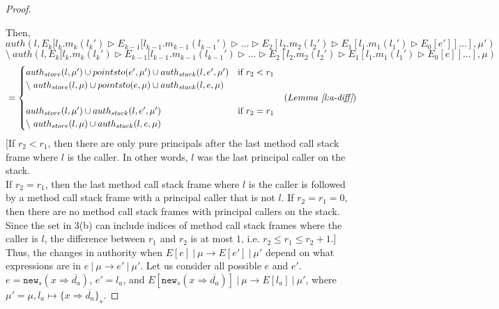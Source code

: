 \documentclass{llncs}
\newcommand{\keywadj}[1]{\mathtt{#1}}
\newcommand{\intuition}[1]{#1}
\begin{document}
\begin{proof}
\begin{enumerate}
\end{enumerate}
Then,
\noindent$auth(l, E_k[l_k.m_k(l_k') \rhd E_{k-1}[l_{k-1}.m_{k-1}(l_{k-1}') \rhd \dots \rhd E_2[l_2.m_2(l_2') \rhd E_1[l_1.m_1(l_1') \rhd E_0[e']] \dots ], \mu')$\\
$\setminus~auth(l, E_k[l_k.m_k(l_k') \rhd E_{k-1}[l_{k-1}.m_{k-1}(l_{k-1}') \rhd \dots \rhd E_2[l_2.m_2(l_2') \rhd E_1[l_1.m_1(l_1') \rhd E_0[e]] \dots ], \mu)$
\vspace{-7pt}
\begin{align*}
&=
\begin{cases}
    auth_{store}(l, \mu') \cup pointsto(e', \mu') \cup auth_{stack}(l, e', \mu') & \text{if } r_2 < r_1\\
    \setminus~auth_{store}(l, \mu) \cup pointsto(e, \mu) \cup auth_{stack}(l, e, \mu)\\\\
    auth_{store}(l, \mu') \cup auth_{stack}(l, e', \mu')& \text{if } r_2 = r_1\\
    \setminus~auth_{store}(l, \mu) \cup auth_{stack}(l, e, \mu)
\end{cases} & (Lemma~\textit{\ref{l:a-diff}})
\end{align*}
\intuition{[If $r_2 < r_1$, then there are only pure principals after the last method call stack frame where $l$ is the caller. In other words, $l$ was the last principal caller on the stack.\\
If $r_2 = r_1$, then the last method call stack frame where $l$ is the caller is followed by a method call stack frame with a principal caller that is not $l$. If $r_2 = r_1 = 0$, then there are no method call stack frames with principal callers on the stack.\\
Since the set in 3(b) can include indices of method call stack frames where the caller is $l$, the difference between $r_1$ and $r_2$ is at most $1$, i.e. $r_2 \le r_1 \le r_2 + 1$.]}\\
Thus, the changes in authority when $E[e]~|~\mu \longrightarrow E[e']~|~\mu'$ depend on what expressions are in $e~|~\mu \longrightarrow e'~|~\mu'$. Let us consider all possible $e$ and $e'$.\\


\noindent{}
\mbox{$e = \keywadj{new}_s(x \Rightarrow \overline{d_a})$}, \mbox{$e' = l_a$}, and \mbox{$E[\keywadj{new}_s(x \Rightarrow \overline{d_a})]~|~\mu \longrightarrow E[l_a]~|~\mu'$}, where\\
\mbox{$\mu' = \mu, l_a \mapsto \{ x \Rightarrow \overline{d_a} \}_s$}.


\end{proof}
\end{document}
